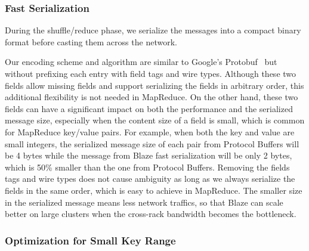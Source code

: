 \subsubsection{Fast Serialization}
During the shuffle/reduce phase, we serialize the messages into a compact binary format before casting them across the network.

Our encoding scheme and algorithm are similar to Google's Protobuf~\cite{protobuf} but without prefixing each entry with field tags and wire types.
Although these two fields allow missing fields and support serializing the fields in arbitrary order, this additional flexibility is not needed in MapReduce.
On the other hand, these two fields can have a significant impact on both the performance and the serialized message size, especially when the content size of a field is small, which is common for MapReduce key/value pairs.
For example, when both the key and value are small integers, the serialized message size of each pair from Protocol Buffers will be 4 bytes while the message from Blaze fast serialization will be only 2 bytes, which is 50\% smaller than the one from Protocol Buffers.
Removing the fields tags and wire types does not cause ambiguity as long as we always serialize the fields in the same order, which is easy to achieve in MapReduce.
The smaller size in the serialized message means less network traffics, so that Blaze can scale better on large clusters when the cross-rack bandwidth becomes the bottleneck.




\subsubsection{Optimization for Small Key Range}

